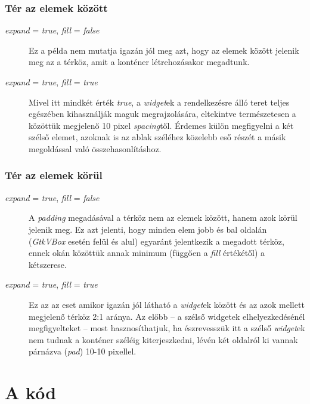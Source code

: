 \documentclass[a4paper,10pt]{article}
\begin{document}
\subsubsection{Tér az elemek között}

\begin{description}
 \item[\textit{expand} = \textit{true}, \textit{fill} = \textit{false}] Ez a példa nem mutatja igazán jól meg azt, hogy az elemek között jelenik meg az a térköz, amit a konténer létrehozásakor megadtunk.

 \item[\textit{expand} = \textit{true}, \textit{fill} = \textit{true}] Mivel itt mindkét érték \textit{true}, a \textit{widget}ek a rendelkezésre álló teret teljes egészében kihasználják maguk megrajzolására, eltekintve természetesen a közöttük megjelenő 10 pixel \textit{spacing}től. Érdemes külön megfigyelni a két szélső elemet, azoknak is az ablak széléhez közelebb eső részét a másik megoldással való összehasonlításhoz.
\end{description}

\subsubsection{Tér az elemek körül}

\begin{description}
 \item[\textit{expand} = \textit{true}, \textit{fill} = \textit{false}] A \textit{padding} megadásával a térköz nem az elemek között, hanem azok körül jelenik meg. Ez azt jelenti, hogy minden elem jobb és bal oldalán (\textit{GtkVBox} esetén felül és alul) egyaránt jelentkezik a megadott térköz, ennek okán közöttük annak minimum (függően a \textit{fill} értékétől) a kétszerese.

 \item[\textit{expand} = \textit{true}, \textit{fill} = \textit{true}] Ez az az eset amikor igazán jól látható a \textit{widget}ek között és az azok mellett megjelenő térköz 2:1 aránya. Az előbb -- a szélső widgetek elhelyezkedésénél megfigyelteket -- most hasznosíthatjuk, ha észrevesszük itt a szélső \textit{widget}ek nem tudnak a konténer széléig kiterjeszkedni, lévén két oldalról ki vannak párnázva (\textit{pad}) 10-10 pixellel.
\end{description}

\section{A kód}
\end{document}
